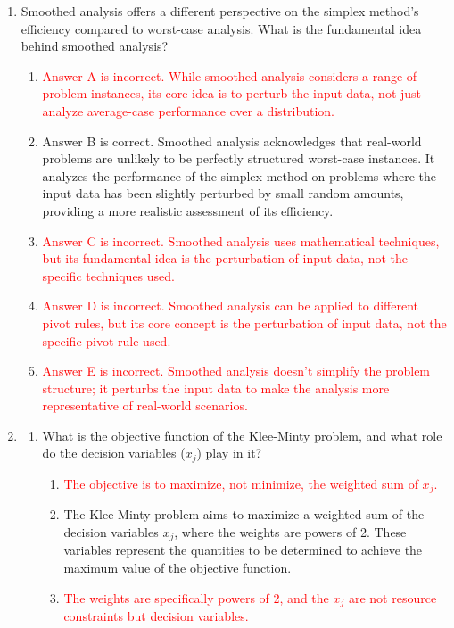 \documentclass{article}%
\newcommand{\incorrect}[1]{\textcolor{red}{#1}}
\begin{document}
\begin{enumerate}
\begin{enumerate}
\end{enumerate}%
\vspace{1em}%
\item Smoothed analysis offers a different perspective on the simplex method's efficiency compared to worst-case analysis. What is the fundamental idea behind smoothed analysis?%
\begin{enumerate}%
\item \incorrect{Answer A is incorrect. While smoothed analysis considers a range of problem instances, its core idea is to perturb the input data, not just analyze average-case performance over a distribution.}%
\item Answer B is correct. Smoothed analysis acknowledges that real-world problems are unlikely to be perfectly structured worst-case instances. It analyzes the performance of the simplex method on problems where the input data has been slightly perturbed by small random amounts, providing a more realistic assessment of its efficiency.%
\item \incorrect{Answer C is incorrect.  Smoothed analysis uses mathematical techniques, but its fundamental idea is the perturbation of input data, not the specific techniques used.}%
\item \incorrect{Answer D is incorrect.  Smoothed analysis can be applied to different pivot rules, but its core concept is the perturbation of input data, not the specific pivot rule used.}%
\item \incorrect{Answer E is incorrect. Smoothed analysis doesn't simplify the problem structure; it perturbs the input data to make the analysis more representative of real-world scenarios.}%
\end{enumerate}%
\vspace{1em}%
\item%
\begin{enumerate}%
\item What is the objective function of the Klee-Minty problem, and what role do the decision variables ($x_j$) play in it?%
\begin{enumerate}%
\item \incorrect{The objective is to maximize, not minimize, the weighted sum of $x_j$.}%
\item The Klee-Minty problem aims to maximize a weighted sum of the decision variables $x_j$, where the weights are powers of 2.  These variables represent the quantities to be determined to achieve the maximum value of the objective function.%
\item \incorrect{The weights are specifically powers of 2, and the $x_j$ are not resource constraints but decision variables.}%

\end{enumerate}
\end{enumerate}
\end{enumerate}
\end{document}
